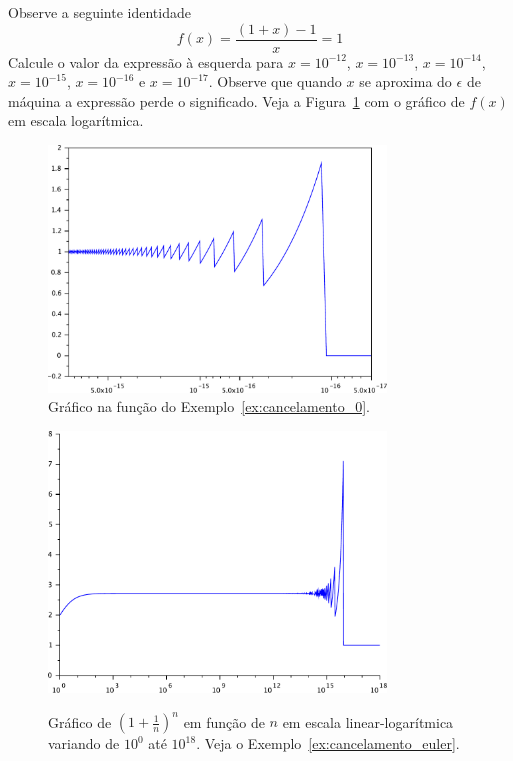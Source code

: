 \begin{ex}\label{ex:cancelamento_0}Observe a seguinte identidade
$$
f(x)=\frac{(1+x)-1}{x}=1
$$
Calcule o valor da expressão à esquerda para $x=10^{-12}$, $x=10^{-13}$, $x=10^{-14}$, $x=10^{-15}$, $x=10^{-16}$ e $x=10^{-17}$. Observe que quando $x$ se aproxima do $\epsilon$ de máquina a expressão perde o significado. Veja a Figura~\ref{fig:cancelamento_0} com o gráfico de $f(x)$ em escala logarítmica.
\end{ex}

\begin{figure}
  \centering
  \includegraphics[width=0.8\textwidth]{./cap_aritmetica/pics/cancelamento_0}  
  \caption{Gráfico na função do Exemplo~\ref{ex:cancelamento_0}.}
  \label{fig:cancelamento_0}
\end{figure}


\begin{figure}
  \includegraphics[width=0.8\textwidth]{./cap_aritmetica/pics/cancelamento_euler}
  \label{fig:cancelamento_euler}
  \caption{Gráfico de $\left(1+\frac{1}{n}\right)^n$ em função de $n$ em escala linear-logarítmica variando de $10^0$ até $10^{18}$. Veja o Exemplo~\ref{ex:cancelamento_euler}.}
\end{figure}

